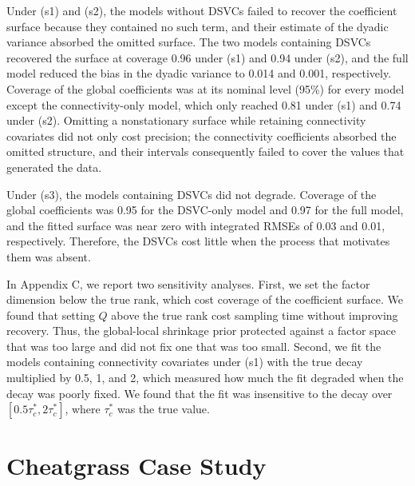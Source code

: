 \documentclass{article}
\begin{document}
Under (s1) and (s2), the models without DSVCs failed to recover the coefficient surface because they contained no such term, and their estimate of the dyadic variance absorbed the omitted surface. 
The two models containing DSVCs recovered the surface at coverage 0.96 under (s1) and 0.94 under (s2), and the full model reduced the bias in the dyadic variance to 0.014 and 0.001, respectively. Coverage of the global coefficients was at its nominal level (95\%) for every model except the connectivity-only model, which only reached 0.81 under (s1) and 0.74 under (s2).
Omitting a nonstationary surface while retaining connectivity covariates did not only cost precision; the connectivity coefficients absorbed the omitted structure, and their intervals consequently failed to cover the values that generated the data.

Under (s3), the models containing DSVCs did not degrade. Coverage of the global coefficients was 0.95 for the DSVC-only model and 0.97 for the full model, and the fitted surface was near zero with integrated RMSEs of 0.03 and 0.01, respectively. Therefore, the DSVCs cost little when the process that motivates them was absent. 

In Appendix C, we report two sensitivity analyses. First, we set the factor dimension below the true rank, which cost coverage of the coefficient surface. We found that setting $Q$ above the true rank cost sampling time without improving recovery. Thus, the global-local shrinkage prior protected against a factor space that was too large and did not fix one that was too small. 
Second, we fit the models containing connectivity covariates under (s1) with the true decay multiplied by 0.5, 1, and 2, which measured how much the fit degraded when the decay was poorly fixed.
We found that the fit was insensitive to the decay over $[0.5\tau_c^*,2\tau_c^*]$, where $\tau_c^*$ was the true value.

\section{Cheatgrass Case Study}
\label{sec:cheatgrass}
\end{document}
